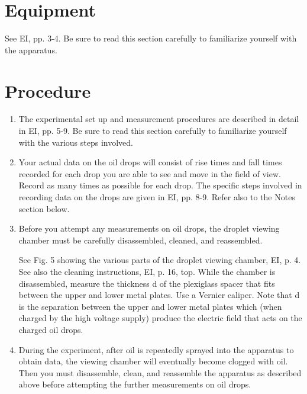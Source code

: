 \section{Equipment}
See EI, pp. 3-4.  Be sure to read this section carefully to
familiarize yourself with the apparatus.


\section{Procedure}

\begin{enumerate}
\item The experimental set up and measurement procedures are described
in detail in EI, pp. 5-9. Be sure to read this section carefully to
familiarize yourself with the various steps involved.


\item Your actual data on the oil drops will consist of rise times and
fall times recorded for each drop you are able to see and move in the
field of view.  Record as many times as possible for each drop. The
specific steps involved in recording data on the drops are given in EI,
pp. 8-9.  Refer also to the Notes section below.

\item Before you attempt any measurements on oil drops, the droplet
viewing chamber must be carefully disassembled, cleaned, and
reassembled.


See Fig. 5 showing the various parts of the droplet viewing chamber,
EI, p. 4.  See also the cleaning instructions, EI, p. 16, top. While
the chamber is disassembled, measure the thickness d of the plexiglass
spacer that fits between the upper and lower metal plates. Use a
Vernier caliper.  Note that d is the separation between the upper and
lower metal plates which (when charged by the high voltage supply)
produce the electric field that acts on the charged oil drops.


\item During the experiment, after oil is repeatedly sprayed into the
apparatus to obtain data, the viewing chamber will eventually become
clogged with oil. Then you must disassemble, clean, and reassemble the
apparatus as described above before attempting the further measurements
on oil drops.
\end{enumerate}

